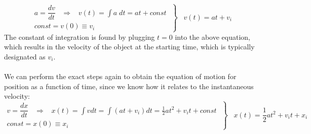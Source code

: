 \documentclass[12pt,addpoints]{exam}
\begin{document}
	$$\left. \begin{array}{l} a = \dfrac{dv}{dt}\;\;\; \Rightarrow \;\;\;v\left( t \right) = \int {a\;dt} = at + const \;\\ const = v\left( 0 \right) \equiv {v_i} \end{array} \right\}\;\;\;v\left( t \right) = at + {v_i}$$
	The constant of integration is found by plugging  $t=0$
	into the above equation, which results in the velocity of the object at the starting time, which is typically designated as $v_i$. \\ \\
	We can perform the exact steps again to obtain the equation of motion for position as a function of time, since we know how it relates to the instantaneous velocity:
	$$\left. \begin{array}{l} v = \dfrac{dx}{dt}\;\;\; \Rightarrow \;\;\;x\left( t \right) = \int {vdt} = \int {\left( {at + {v_i}} \right)dt} = \frac{1}{2}a{t^2} + {v_i}t + const \;\\ const = x\left( 0 \right) \equiv {x_i} \end{array} \right\}\;\;\;x\left( t \right) = \frac{1}{2}a{t^2} + {v_i}t + {x_i}$$
	
	
\end{document}

